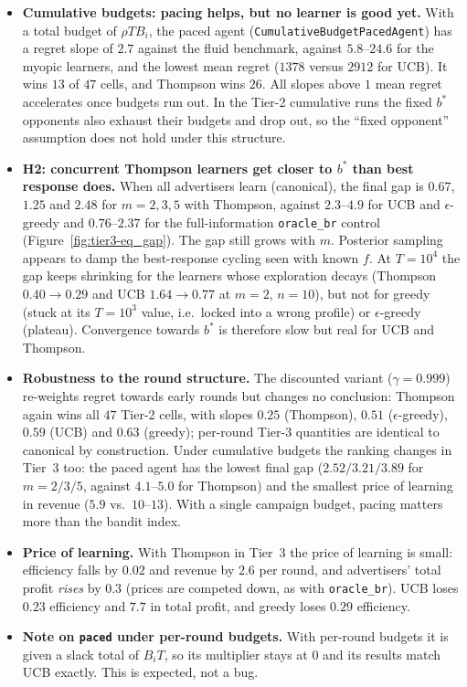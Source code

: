 \documentclass[11pt]{article}
\theoremstyle{remark}
\begin{document}
\begin{itemize}[leftmargin=*]
  Thompson's regret per round is flat in $\kappa$ ($0.45$--$0.53$), and UCB's \emph{grows} with
  $\kappa$ ($0.81$ at $\kappa=0.25$ to $3.38$ at $\kappa=1$), because a larger budget lets an optimistic
  learner buy more exploratory impressions per round.
  \item \textbf{Cumulative budgets: pacing helps, but no learner is good yet.} With a total budget of
  $\rho TB_i$, the paced agent (\texttt{CumulativeBudgetPacedAgent}) has a regret slope of $2.7$ against the
  fluid benchmark, against $5.8$--$24.6$ for the myopic learners, and the lowest mean regret
  ($1378$ versus $2912$ for UCB). It wins $13$ of $47$ cells, and Thompson wins $26$. All slopes above $1$
  mean regret accelerates once budgets run out. In the Tier-2 cumulative runs the fixed $b^*$ opponents
  also exhaust their budgets and drop out, so the ``fixed opponent'' assumption does not hold under this
  structure.
  \item \textbf{H2: concurrent Thompson learners get closer to $b^*$ than best response does.} When all
  advertisers learn (canonical), the final gap is $0.67$, $1.25$ and $2.48$ for $m=2,3,5$ with Thompson,
  against $2.3$--$4.9$ for UCB and $\epsilon$-greedy and $0.76$--$2.37$ for the full-information
  \texttt{oracle\_br} control (Figure~\ref{fig:tier3-eq_gap}). The gap still grows with $m$. Posterior
  sampling appears to damp the best-response cycling seen with known $f$. At $T=10^4$ the gap keeps
  shrinking for the learners whose exploration decays (Thompson $0.40\to0.29$ and UCB $1.64\to0.77$ at
  $m=2$, $n=10$), but not for greedy (stuck at its $T=10^3$ value, i.e.\ locked into a wrong profile) or
  $\epsilon$-greedy (plateau). Convergence towards $b^*$ is therefore slow but real for UCB and Thompson.
  \item \textbf{Robustness to the round structure.} The discounted variant ($\gamma=0.999$) re-weights
  regret towards early rounds but changes no conclusion: Thompson again wins all $47$ Tier-2 cells, with
  slopes $0.25$ (Thompson), $0.51$ ($\epsilon$-greedy), $0.59$ (UCB) and $0.63$ (greedy); per-round
  Tier-3 quantities are identical to canonical by construction. Under cumulative budgets the ranking
  changes in Tier~3 too: the paced agent has the lowest final gap ($2.52/3.21/3.89$ for $m=2/3/5$,
  against $4.1$--$5.0$ for Thompson) and the smallest price of learning in revenue ($5.9$ vs.\
  $10$--$13$). With a single campaign budget, pacing matters more than the bandit index.
  \item \textbf{Price of learning.} With Thompson in Tier~3 the price of learning is small: efficiency
  falls by $0.02$ and revenue by $2.6$ per round, and advertisers' total profit \emph{rises} by $0.3$
  (prices are competed down, as with \texttt{oracle\_br}). UCB loses $0.23$ efficiency and $7.7$ in
  total profit, and greedy loses $0.29$ efficiency.
  \item \textbf{Note on \texttt{paced} under per-round budgets.} With per-round budgets it is given a
  slack total of $B_iT$, so its multiplier stays at $0$ and its results match UCB exactly. This is
  expected, not a bug.
\end{itemize}
\end{document}
